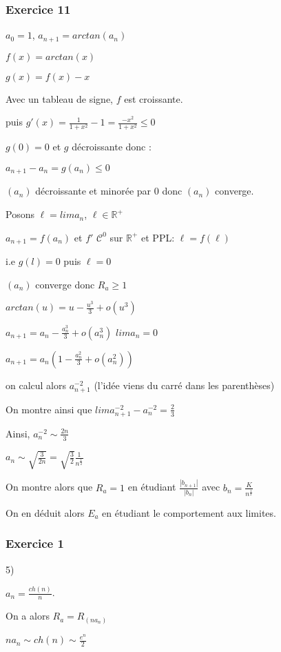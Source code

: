 \documentclass[a4paper, 11pt, hidelinks]{article}
\begin{document}
\subsubsection{Exercice 11}

$a_0=1$, $a_{n+1}=arctan(a_n)$


$f(x)=arctan(x)$

$g(x)=f(x)-x$

Avec un tableau de signe, $f$ est croissante.

puis $g'(x)=\frac{1}{1+x^2}-1=\frac{-x^2}{1+x^2}\leq 0$

$g(0)=0$ et $g$ décroissante donc :

$a_{n+1}-a_n=g(a_n)\leq 0$

$(a_n)$ décroissante et minorée par $0$ donc $(a_n)$ converge.

Posons $\ell=lim a_n$, $\ell \in \mathbb{R}^+$

$a_{n+1}=f(a_n)$ et $f'$ $\mathscr{C}^0$ sur $\mathbb{R}^+$ et PPL: $\ell = f(\ell)$

i.e $g(l)=0$ puis $\ell=0$

$(a_n)$ converge donc $R_a\geq 1$

$arctan(u)=u-\frac{u^3}{3} + o(u^3)$

$a_{n+1}=a_n-\frac{a_n^3}{3} + o(a_n^3)$     $lim a_n =0$

$a_{n+1}=a_n(1-\frac{a_n^2}{3} + o (a_n^2))$


on calcul alors $a_{n+1}^{-2}$ (l'idée viens du carré dans les parenthèses)

On montre ainsi que $lim a_{n+1}^{-2} -a_n^{-2}=\frac{2}{3}$

Ainsi, $a_n^{-2} \sim \frac{2n}{3}$

$a_n \sim \sqrt{\frac{3}{2n}}=\sqrt{\frac{3}{2}} \frac{1}{n^{\frac{1}{2}}}$

On montre alors que $R_a =1$ en étudiant $\frac{|b_{n+1}|}{|b_n|}$ avec $b_n=\frac{K}{n^{\frac{1}{2}}}$

On en déduit alors $E_a$ en étudiant le comportement aux limites.



\subsubsection{Exercice 1}

5)

$a_n=\frac{ch(n)}{n}$.

On a alors $R_a=R_{(na_n)}$

$na_n \sim ch(n) \sim \frac{e^n}{2}$
\end{document}
